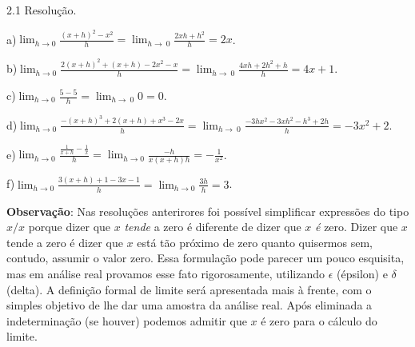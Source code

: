 \documentclass{article}
\begin{document}
{\begin{newpage}
\begin{flushleft}
2.1 Resolução.
\end{flushleft}
\par
\vspace{0.3cm}
a)$\displaystyle{\lim_{h\to 0} \frac{(x+h)^2 - x^2}{h} = \lim_{h\to\ 0} \frac{2xh + h^2}{h} = 2x}$.
\par
\vspace{0.3cm}
b)$\displaystyle{\lim_{h\to 0} \frac{2(x+h)^2 + (x+h) - 2x^2 - x}{h} = \lim_{h\to\ 0} \frac{4xh + 2h^2 + h}{h} = 4x + 1}$.
\par
\vspace{0.3cm}
c)$\displaystyle{\lim_{h\to 0} \frac{5-5}{h} = \lim_{h\to\ 0} 0 = 0}$.
\par
\vspace{0.3cm}
d)$\displaystyle{\lim_{h\to 0} \frac{-(x+h)^3 + 2(x+h) + x^3 - 2x}{h} =\lim_{h\to\ 0} \frac{-3hx^2 - 3xh^2 - h^3 + 2h}{h} = -3x^2 + 2}$.
\par
\vspace{0.3cm}
e)$\displaystyle{\lim_{h\to 0} \frac{\frac{1}{x+h} - \frac{1}{x}}{h} =\lim_{h\to 0} \frac{-h}{x(x+h)h} = -\frac{1}{x^2}}$.
\par
\vspace{0.3cm}
f)$\displaystyle{\lim_{h\to 0} \frac{3(x+h) + 1 - 3x - 1}{h} = \lim_{h\to 0} \frac{3h}{h}= 3}$.
\par
\vspace{0.3cm}
\textbf{Observação}: Nas resoluções anterirores foi possível simplificar expressões do tipo $x/x$ porque dizer que $x$ \textit{tende} a zero é diferente de dizer que $x$ \textit{é} zero. Dizer que $x$ tende a zero é dizer que $x$ está tão próximo de zero quanto quisermos sem, contudo, assumir o valor zero. Essa formulação pode parecer um pouco esquisita, mas em análise real provamos esse fato rigorosamente, utilizando $\epsilon $ (épsilon) e $\delta $ (delta). A definição formal de limite será apresentada mais à frente, com o simples objetivo de lhe dar uma amostra da análise real. Após eliminada a indeterminação (se houver) podemos admitir que $x$ é zero para o cálculo do limite.

\end{newpage}}
\end{document}
